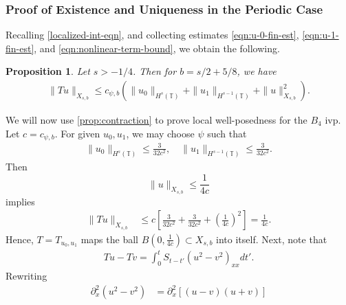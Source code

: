 \documentclass[12pt,reqno]{amsart}
\numberwithin{equation}{section}  %
\numberwithin{figure}{section}
\newcommand{\ci}{\mathbb{T}}
\newcommand{\p}{\partial}
\theoremstyle{plain}
\newtheorem{proposition}{Proposition}
\theoremstyle{definition}
\theoremstyle{remark}
\begin{document}
\subsubsection{Proof of Existence and Uniqueness in the Periodic Case}
\label{sssec:proof-b4-per-case}
%
%
Recalling \eqref{localized-int-eqn}, and collecting estimates \eqref{eqn:u-0-fin-est}, \eqref{eqn:u-1-fin-est}, and
\eqref{eqn:nonlinear-term-bound}, we obtain the following.
%
%				 
%
\begin{proposition}
\label{prop:contraction}
Let  $s > -1/4$. Then for $b = s/2 + 5/8$, we have
%
\begin{equation*}
	\begin{split}
    \|Tu\|_{X_{s,b}} \le c_{\psi, b} \left( \|u_0 \|_{H^s(\ci)} + \|u_1 \|_{H^{s-1}(\ci)}
    + \|u\|_{X_{s,b}}^2 
		\right).
	\end{split}
\end{equation*}
%
\end{proposition}
We will now use \autoref{prop:contraction} to prove local well-posedness for the 
$B_4$ ivp. Let $c = c_{\psi, b}$. For given $u_0, u_1$, we may choose $\psi$ such
that 
%
\begin{equation*}
	\begin{split}
    \|u_0\|_{H^s(\ci)} \le \frac{3}{32c^2}, \quad \|u_1\|_{H^{s-1}(\ci)} \le \frac{3}{32c^2}.
	\end{split}
\end{equation*}
%
Then $$\|u\|_{X_{s,b}} \le \frac{1}{4c}$$ implies
%
\begin{equation*}
	\begin{split}
		\|T u \|_{X_{s,b}} 
		& \le c \left[ \frac{3}{32c^2} + \frac{3}{32c^2}+ \left( 
		\frac{1}{4c} \right)^2 \right]
		=  \frac{1}{4c}.
	\end{split}
\end{equation*}
%
Hence, $T=T_{u_0, u_1}$ maps the ball $B\left( 0, \frac{1}{4c} \right) \subset
X_{s,b}$ into itself. Next, note that 
%
\begin{equation*}
	\begin{split}
		Tu - Tv = 
    \int_{0}^{t} S_{t-t'}
    (u^{2} - v^{2})_{xx} dt'.
  \end{split}
  \label{eqn:integral-form-dif}
\end{equation*}
%
Rewriting
%
\begin{equation*}
	\begin{split}
	\p_x^2 (u^2 - v^2)	
		& = \p_x^2[(u-v)(u+v)]
		\end{split}
\end{equation*}
\end{document}
